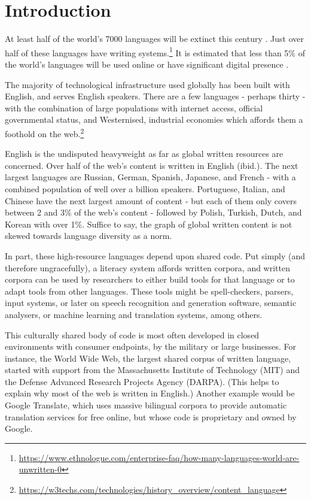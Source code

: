 \section{Introduction}\label{sec:intro}

At least half of the world's 7000 languages will be extinct this century \citep[p. 27]{grenoble_2011}. Just over half of these languages have writing systems.\footnote{\href{https://www.ethnologue.com/enterprise-faq/how-many-languages-world-are-unwritten-0}{https://www.ethnologue.com/enterprise-faq/how-many-languages-world-are-unwritten-0}} It is estimated that less than 5\% of the world's languages will be used online or have significant digital presence \citep{kornai2013digital}.

The majority of technological infrastructure used globally has been built with English, and serves English speakers. There are a few languages - perhaps thirty - with the combination of large populations with internet access, official governmental status, and Westernised, industrial economies which affords them a foothold on the web.\footnote{\href{https://w3techs.com/technologies/history\_overview/content\_language}{https://w3techs.com/technologies/history\_overview/content\_language}}

English is the undisputed heavyweight as far as global written resources are concerned. Over half of the web's content is written in English (ibid.). The next largest languages are Russian, German, Spanish, Japanese, and French - with a combined population of well over a billion speakers. Portuguese, Italian, and Chinese have the next largest amount of content - but each of them only covers between 2 and 3\% of the web's content - followed by Polish, Turkish, Dutch, and Korean with over 1\%. Suffice to say, the graph of global written content is not skewed towards language diversity as a norm.

In part, these high-resource languages depend upon shared code. Put simply (and therefore ungracefully), a literacy system affords written corpora, and written corpora can be used by researchers to either build tools for that language or to adapt tools from other languages. These tools might be spell-checkers, parsers, input systems, or later on speech recognition and generation software, semantic analysers, or machine learning and translation systems, among others.

This culturally shared body of code is most often developed in closed environments with consumer endpoints, by the military or large businesses. For instance, the World Wide Web, the largest shared corpus of written language, started with support from  the Massachusetts Institute of Technology (MIT) and the Defense Advanced Research Projects Agency (DARPA). (This helps to explain why most of the web is written in English.) Another example would be Google Translate, which uses massive bilingual corpora to provide automatic translation services for free online, but whose code is proprietary and owned by Google.

